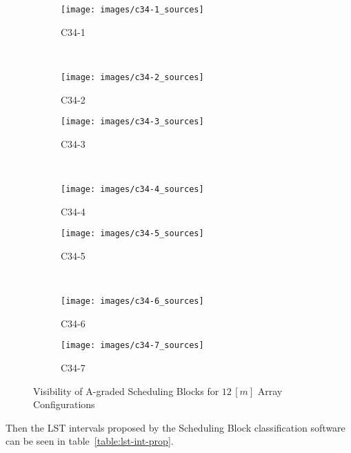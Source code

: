 \begin{figure}[htbp]
        \centering
        \begin{subfigure}[b]{0.45\textwidth}
                \texttt{[image: images/c34-1\_sources]}
                \caption{C34-1} 
        \end{subfigure} 
        ~ %
%
        \begin{subfigure}[b]{0.45\textwidth}
                \texttt{[image: images/c34-2\_sources]}
                \caption{C34-2}
        \end{subfigure}

        \begin{subfigure}[b]{0.45\textwidth}
                \texttt{[image: images/c34-3\_sources]}
                \caption{C34-3}
        \end{subfigure}
        ~ 
        \begin{subfigure}[b]{0.45\textwidth}
                \texttt{[image: images/c34-4\_sources]}
                \caption{C34-4}
        \end{subfigure}%
        
        \begin{subfigure}[b]{0.45\textwidth}
                \texttt{[image: images/c34-5\_sources]}
                \caption{C34-5}
        \end{subfigure}
        ~
        \begin{subfigure}[b]{0.45\textwidth}
                \texttt{[image: images/c34-6\_sources]}
                \caption{C34-6}
        \end{subfigure}
        
        \begin{subfigure}[b]{0.45\textwidth}
                \texttt{[image: images/c34-7\_sources]}
                \caption{C34-7}
        \end{subfigure}           
        \caption{Visibility of A-graded Scheduling Blocks for $12\,[m]$ Array Configurations}
		\label{fig:results-sb-critical-set}
\end{figure}

Then the LST intervals proposed by the Scheduling Block classification software can be seen in table~\ref{table:lst-int-prop}.

